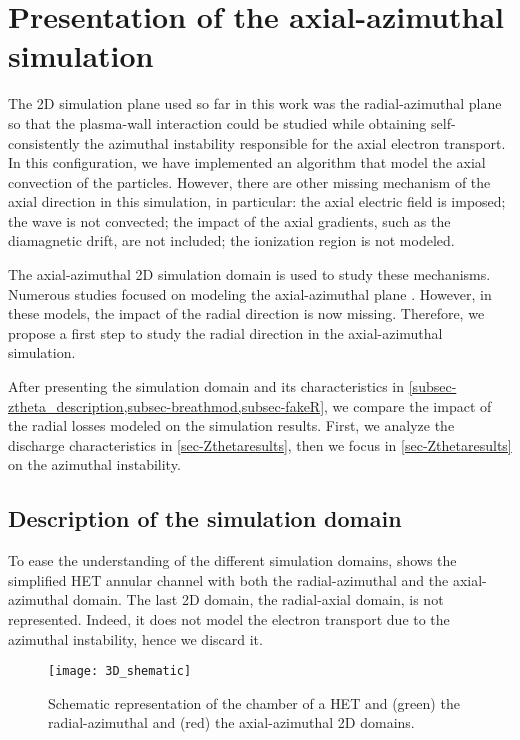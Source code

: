 
\section{Presentation of the axial-azimuthal simulation}

The \ac{2D} simulation plane used so far in this work was the radial-azimuthal plane so that the plasma-wall interaction could be studied while obtaining self-consistently the azimuthal instability responsible for the axial electron transport.
In this configuration, we have implemented an algorithm that model the axial convection of the particles.
However, there are other missing mechanism of the axial direction in this simulation, in particular\string: the axial electric field is imposed\string; the wave is not convected\string; the impact of the axial gradients, such as the diamagnetic drift, are not included\string; the ionization region is not modeled.

The axial-azimuthal \ac{2D} simulation domain is used to study these mechanisms.
Numerous  studies focused on modeling the axial-azimuthal plane \citep{adam2004,coche2014,boeuf2018,taccogna2019}.
However, in these models, the impact of the radial direction is now missing.
Therefore, we propose a first step to study the radial direction in the axial-azimuthal simulation.

After presenting the simulation domain and its characteristics in \cref{subsec-ztheta_description,subsec-breathmod,subsec-fakeR}, we compare the impact of the radial losses modeled on the simulation results.
First, we analyze the discharge characteristics in \cref{sec-Zthetaresults}, then we focus in \cref{sec-Zthetaresults} on the azimuthal instability.


\subsection{Description of the simulation domain} \label{subsec-ztheta_description}
To ease the understanding of the different simulation domains,  shows the simplified \ac{HET} annular channel with both the radial-azimuthal and the axial-azimuthal \ztheta domain.
The last \ac{2D} domain, the radial-axial domain, is not represented.
Indeed, it does not model the electron transport due to the azimuthal instability, hence we discard it.

\begin{figure}[hbt]
  \centering
  \texttt{[image: 3D\_shematic]}
  \caption{Schematic representation of the chamber of a \ac{HET} and (green) the radial-azimuthal and (red) the axial-azimuthal 2D domains.}
  \label{fig-3Dschematic}
\end{figure}

